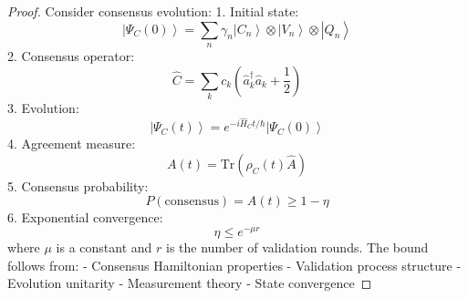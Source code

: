\documentclass[12pt]{article}
\newcommand{\ket}[1]{\left|#1\right\rangle}
\newcommand{\tr}{\text{Tr}}
\newcommand{\op}[1]{\hat{#1}}
\begin{document}
\begin{proof}
Consider consensus evolution:
1. Initial state:
\begin{equation}
\ket{\Psi_C(0)} = \sum_n \gamma_n\ket{C_n} \otimes \ket{V_n} \otimes \ket{Q_n}
\end{equation}
2. Consensus operator:
\begin{equation}
\op{C} = \sum_k c_k(\op{a}_k^\dagger\op{a}_k + \frac{1}{2})
\end{equation}
3. Evolution:
\begin{equation}
\ket{\Psi_C(t)} = e^{-i\op{H}_Ct/\hbar}\ket{\Psi_C(0)}
\end{equation}
4. Agreement measure:
\begin{equation}
A(t) = \tr(\rho_C(t)\op{A})
\end{equation}
5. Consensus probability:
\begin{equation}
P(\text{consensus}) = A(t) \geq 1 - \eta
\end{equation}
6. Exponential convergence:
\begin{equation}
\eta \leq e^{-\mu r}
\end{equation}
where $\mu$ is a constant and $r$ is the number of validation rounds.
The bound follows from:
- Consensus Hamiltonian properties
- Validation process structure
- Evolution unitarity
- Measurement theory
- State convergence
\end{proof}
\end{document}
